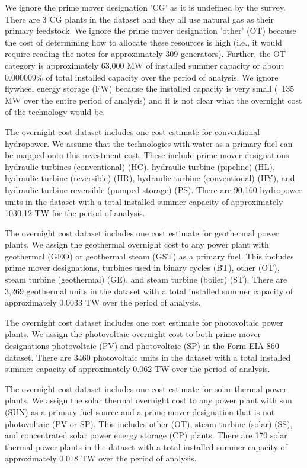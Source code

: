 \documentclass[10pt]{amsart}
\begin{document}
We ignore the prime mover designation 'CG' as it is undefined by the survey. 
There are 3 CG plants in the dataset and they all use natural gas as their primary feedstock.
We ignore the prime mover designation 'other' (OT) because the cost of determining how to allocate these resources is high (i.e., it would require reading the notes for approximately 309 generators).
Further, the OT category is approximately 63,000 MW of installed summer capacity or about 0.000009\% of total installed capacity over the period of analysis.  
We ignore flywheel energy storage (FW) because the installed capacity is very small (~135 MW over the entire period of analysis) and it is not clear what the overnight cost of the technology would be.  

The overnight cost dataset includes one cost estimate for conventional hydropower.
We assume that the technologies with water as a primary fuel can be mapped onto this investment cost.
These include prime mover designations hydraulic turbines (conventional) (HC), hydraulic turbine (pipeline) (HL), hydraulic turbine (reversible) (HR), hydraulic turbine (conventional) (HY), and hydraulic turbine reversible (pumped storage) (PS). 
There are 90,160 hydropower units in the dataset with a total installed summer capacity of approximately 1030.12 TW for the period of analysis. 

The overnight cost dataset includes one cost estimate for geothermal power plants. 
We assign the geothermal overnight cost to any power plant with geothermal (GEO) or geothermal steam (GST) as a primary fuel. 
This includes prime mover designations, turbines used in binary cycles (BT), other (OT), steam turbine (geothermal) (GE), and steam turbine (boiler) (ST).  
There are 3,269 geothermal units in the dataset with a total installed summer capacity of approximately 0.0033 TW over the period of analysis. 

The overnight cost dataset includes one cost estimate for photovoltaic power plants.
We assign the photovoltaic overnight cost to both prime mover designations photovoltaic (PV) and photovoltaic (SP) in the Form EIA-860 dataset.
There are 3460 photovoltaic units in the dataset with a total installed summer capacity of approximately 0.062 TW over the period of analysis. 

The overnight cost dataset includes one cost estimate for solar thermal power plants. 
We assign the solar thermal overnight cost to any power plant with sun (SUN) as a primary fuel source and a prime mover designation that is not photovoltaic (PV or SP).
This includes other (OT), steam turbine (solar) (SS), and concentrated solar power energy storage (CP) plants.  
There are 170 solar thermal power plants in the dataset with a total installed summer capacity of approximately 0.018 TW over the period of analysis.
\end{document}
